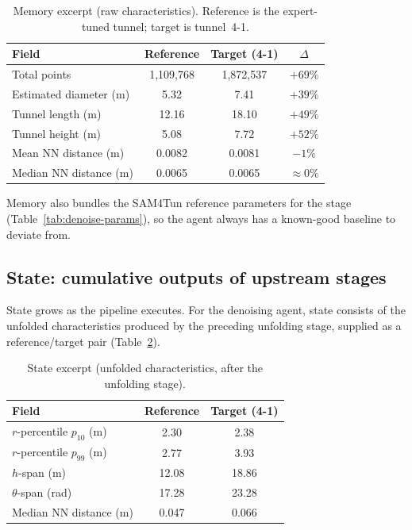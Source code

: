 \begin{table}[ht]
\caption{Memory excerpt (raw characteristics). Reference is the expert-tuned tunnel; target is tunnel~4-1.}\label{tab:context-memory}
\begin{tabular*}{\tblwidth}{@{} l c c c @{}}
\toprule
Field & Reference & Target (4-1) & $\Delta$ \\
\midrule
Total points & 1{,}109{,}768 & 1{,}872{,}537 & $+69\%$ \\
Estimated diameter (m) & 5.32 & 7.41 & $+39\%$ \\
Tunnel length (m) & 12.16 & 18.10 & $+49\%$ \\
Tunnel height (m) & 5.08 & 7.72 & $+52\%$ \\
Mean NN distance (m) & 0.0082 & 0.0081 & $-1\%$ \\
Median NN distance (m) & 0.0065 & 0.0065 & $\approx 0\%$ \\
\bottomrule
\end{tabular*}
\end{table}

Memory also bundles the SAM4Tun reference parameters for the stage (Table~\ref{tab:denoise-params}), so the agent always has a known-good baseline to deviate from.

\subsection{State: cumulative outputs of upstream stages}\label{app:context-state}
State grows as the pipeline executes. For the denoising agent, state consists of the unfolded characteristics produced by the preceding unfolding stage, supplied as a reference/target pair (Table~\ref{tab:context-state}).

\begin{table}[ht]
\caption{State excerpt (unfolded characteristics, after the unfolding stage).}\label{tab:context-state}
\begin{tabular*}{\tblwidth}{@{} l c c @{}}
\toprule
Field & Reference & Target (4-1) \\
\midrule
$r$-percentile $p_{10}$ (m) & 2.30 & 2.38 \\
$r$-percentile $p_{99}$ (m) & 2.77 & 3.93 \\
$h$-span (m) & 12.08 & 18.86 \\
$\theta$-span (rad) & 17.28 & 23.28 \\
Median NN distance (m) & 0.047 & 0.066 \\
\bottomrule
\end{tabular*}
\end{table}

